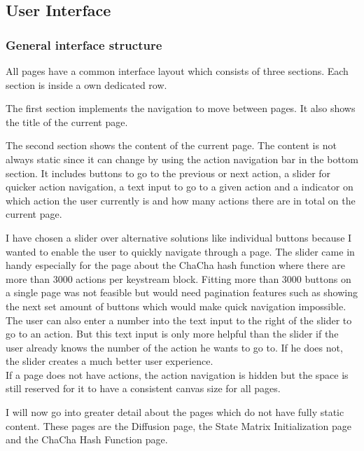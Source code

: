\subsection{User Interface}
\label{sec:userInterface}

\subsubsection{General interface structure}

All pages have a common interface layout which consists of three sections. Each section is inside a own dedicated row.

The first section implements the navigation to move between pages. It also shows the title of the current page.

The second section shows the content of the current page. The content is not always static since it can change by using the action navigation bar in the bottom section. It includes buttons to go to the previous or next action, a slider for quicker action navigation, a text input to go to a given action and a indicator on which action the user currently is and how many actions there are in total on the current page.

I have chosen a slider over alternative solutions like individual buttons because I wanted to enable the user to quickly navigate through a page. The slider came in handy especially for the page about the ChaCha hash function where there are more than 3000 actions per keystream block. Fitting more than 3000 buttons on a single page was not feasible but would need pagination features such as showing the next set amount of buttons which would make quick navigation impossible. \\
The user can also enter a  number into the text input to the right of the slider to go to an action. But this text input is only more helpful than the slider if the user already knows the number of the action he wants to go to. If he does not, the slider creates a much better user experience. \\
If a page does not have actions, the action navigation is hidden but the space is still reserved for it to have a consistent canvas size for all pages.

I will now go into greater detail about the pages which do not have fully static content. These pages are the Diffusion page, the State Matrix Initialization page and the ChaCha Hash Function page.

